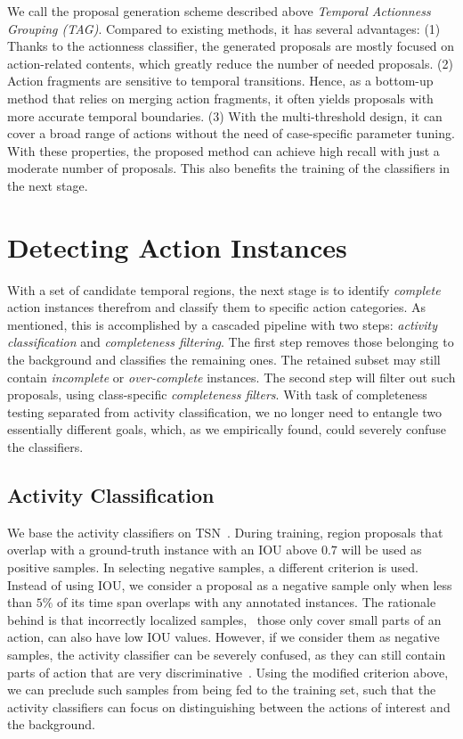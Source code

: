 \documentclass[10pt,twocolumn,letterpaper]{article}
\begin{document}
We call the proposal generation scheme described above 
\emph{Temporal Actionness Grouping (TAG)}.
Compared to existing methods, it has several advantages:
(1) Thanks to the actionness classifier, the generated proposals are mostly 
focused on action-related contents, which greatly reduce the number of needed proposals.
(2) Action fragments are sensitive to temporal transitions. 
Hence, as a bottom-up method that relies on merging action fragments, 
it often yields proposals with more accurate temporal boundaries. 
(3) With the multi-threshold design, it can cover a broad range of actions
without the need of case-specific parameter tuning.
With these properties, the proposed method can achieve high recall with 
just a moderate number of proposals. 
This also benefits the training of the classifiers in the next stage.
 
\section{Detecting Action Instances}
\label{sec:detector}

With a set of candidate temporal regions, 
the next stage is to identify \emph{complete} action instances therefrom and 
classify them to specific action categories.
As mentioned, this is accomplished by a cascaded pipeline with two steps:
\emph{activity classification} and \emph{completeness filtering}.
The first step removes those belonging to the background and 
classifies the remaining ones. 
The retained subset may still contain \emph{incomplete} or
\emph{over-complete} instances.
The second step will filter out such proposals, using 
class-specific \emph{completeness filters}. 
With task of completeness testing separated from 
activity classification, we no longer need to entangle two essentially different goals,
which, as we empirically found, could severely confuse the classifiers.


\subsection{Activity Classification}
\label{sec:detector/cls}

We base the activity classifiers on TSN~\cite{Wang2016TSN}.
During training, region proposals that overlap with a ground-truth instance
with an IOU above $0.7$ will be used as positive samples. 
In selecting negative samples, a different criterion is used.
Instead of using IOU, we consider a proposal as a negative sample
only when less than $5\%$ of its time span overlaps with any annotated instances.
The rationale behind is that incorrectly localized samples, \eg~those only cover
small parts of an action, can also have low IOU values. 
However, if we consider them as negative samples, the activity classifier
can be severely confused, as they can still contain parts of action that are very discriminative~\cite{Schindler2008Snippet}.
Using the modified criterion above, we can preclude such samples
from being fed to the training set, such that
the activity classifiers can focus on distinguishing between the actions of interest
and the background. 
\end{document}
